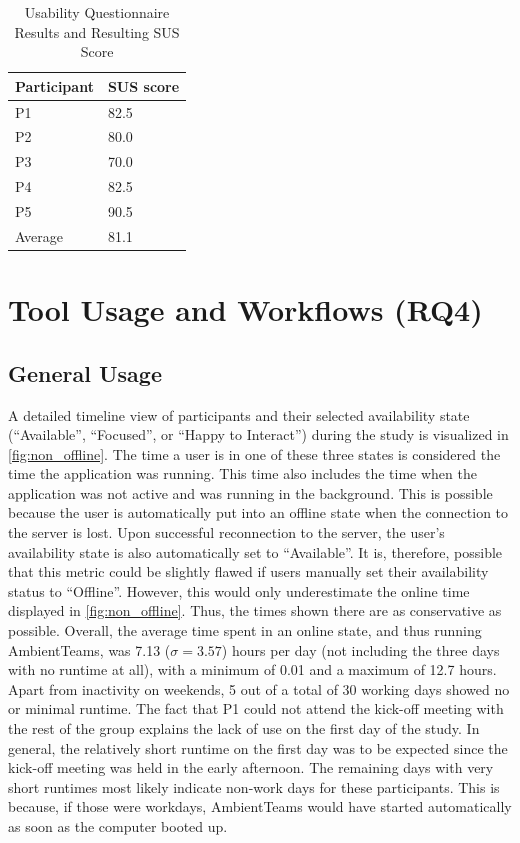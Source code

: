 \begin{table}[h] \footnotesize
    \centering
    \begin{tabularx}{.35\textwidth}{X X}
        \toprule
        Participant & SUS score \\
        \midrule
        P1          & 82.5      \\
        P2          & 80.0      \\
        P3          & 70.0      \\
        P4          & 82.5      \\
        P5          & 90.5      \\
        \midrule
        Average     & 81.1      \\
        \bottomrule
    \end{tabularx}
    \caption{Usability Questionnaire Results and Resulting SUS Score}
    \label{table:sus}
\end{table}

\section{Tool Usage and Workflows (RQ4)}
\label{section:tool_usage_and_workflows}

\subsection{General Usage}
A detailed timeline view of participants and their selected availability state (\enquote{Available}, \enquote{Focused}, or \enquote{Happy to Interact}) during the study is visualized in \autoref{fig:non_offline}. The time a user is in one of these three states is considered the time the application was running. This time also includes the time when the application was not active and was running in the background. This is possible because the user is automatically put into an offline state when the connection to the server is lost. Upon successful reconnection to the server, the user's availability state is also automatically set to \enquote{Available}. It is, therefore, possible that this metric could be slightly flawed if users manually set their availability status to \enquote{Offline}. However, this would only underestimate the online time displayed in \autoref{fig:non_offline}. Thus, the times shown there are as conservative as possible. Overall, the average time spent in an online state, and thus running AmbientTeams, was 7.13 ($\sigma=3.57$) hours per day (not including the three days with no runtime at all), with a minimum of 0.01 and a maximum of 12.7 hours. Apart from inactivity on weekends, 5 out of a total of 30 working days showed no or minimal runtime. The fact that P1 could not attend the kick-off meeting with the rest of the group explains the lack of use on the first day of the study. In general, the relatively short runtime on the first day was to be expected since the kick-off meeting was held in the early afternoon. The remaining days with very short runtimes most likely indicate non-work days for these participants. This is because, if those were workdays, AmbientTeams would have started automatically as soon as the computer booted up.

